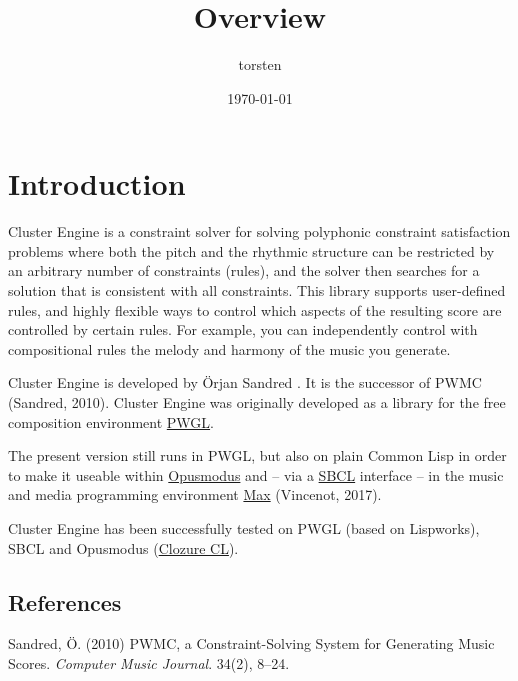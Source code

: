 

\usepackage{color}
\usepackage{listings}
\author{torsten}
\date{\today}
\title{Overview}


\maketitle
\setcounter{tocdepth}{3}
\tableofcontents


\section*{Introduction}
\label{sec:org8376651}

Cluster Engine is a constraint solver for solving polyphonic constraint satisfaction problems where both the pitch and the rhythmic structure can be restricted by an arbitrary number of constraints (rules), and the solver then searches for a solution that is consistent with all constraints. This library supports user-defined rules, and highly flexible ways to control which aspects of the resulting score are controlled by certain rules. For example, you can independently control with compositional rules the melody and harmony of the music you generate. 

Cluster Engine is developed by Örjan Sandred . It is the successor of PWMC (Sandred, 2010). Cluster Engine was originally developed as a library for the free composition environment \href{http://www2.siba.fi/pwgl}{PWGL}. 

The present version still runs in PWGL, but also on plain Common Lisp in order to make it useable within \href{http://opusmodus.com}{Opusmodus} and -- via a \href{http://www.sbcl.org}{SBCL} interface -- in the music and media programming environment \href{https://cycling74.com/products/max}{Max} (Vincenot, 2017).

Cluster Engine has been successfully tested on PWGL (based on Lispworks), SBCL and Opusmodus (\href{http://ccl.clozure.com}{Clozure CL}).


\subsection*{References}
\label{sec:orgd55f42f}

Sandred, Ö. (2010) PWMC, a Constraint-Solving System for Generating Music Scores. \emph{Computer Music Journal}. 34(2), 8–24.

